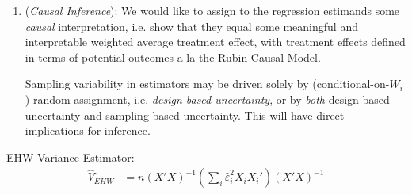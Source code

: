 \documentclass[12pt]{article}
\theoremstyle{plain}
\theoremstyle{definition}
\theoremstyle{remark}
\DeclareMathOperator*{\argmin}{arg\;min}
\newcommand{\sumin}{\sum^n_{i=1}}
\begin{document}
\begin{enumerate}
  \item
    (\emph{Causal Inference}):
    We would like to assign to the regression estimands some
    \emph{causal} interpretation, i.e. show that they equal some
    meaningful and interpretable weighted average treatment effect, with
    treatment effects defined in terms of potential outcomes a la the
    Rubin Causal Model.

    Sampling variability in estimators may be driven solely by
    (conditional-on-$W_i$) random assignment, i.e.
    \emph{design-based uncertainty}, or by \emph{both} design-based
    uncertainty and sampling-based uncertainty.
    This will have direct implications for inference.
\end{enumerate}
EHW Variance Estimator:
\begin{align*}
  \hat{V}_{EHW}
  &=
  n(X'X)^{-1}
  \left(
  \sum_i \hat{\varepsilon}^2_i X_iX_i'
  \right)
  (X'X)^{-1}
\end{align*}


\clearpage
\end{document}
